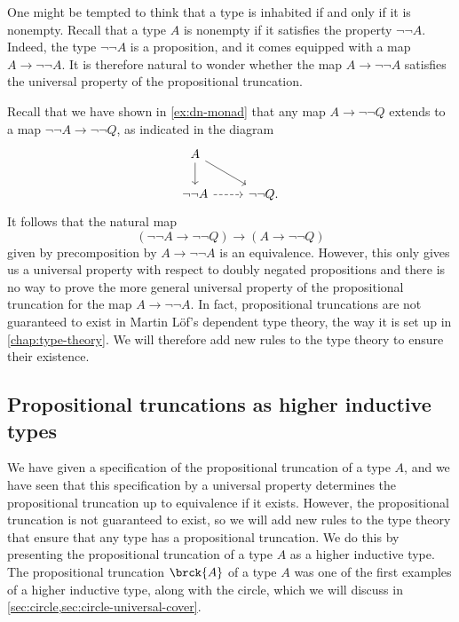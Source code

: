 \begin{rmk}
  One might be tempted to think that a type is inhabited if and only if it is nonempty. Recall that a type $A$ is nonempty if it satisfies the property $\neg\neg A$. Indeed, the type $\neg\neg A$ is a proposition, and it comes equipped with a map $A\to\neg\neg A$. It is therefore natural to wonder whether the map $A\to\neg\neg A$ satisfies the universal property of the propositional truncation.

  Recall that we have shown in \cref{ex:dn-monad} that any map $A\to\neg\neg Q$ extends to a map $\neg\neg A\to\neg\neg Q$, as indicated in the diagram
\begin{equation*}
  \begin{tikzcd}
    A \arrow[d] \arrow[dr] \\
    \neg\neg A \arrow[r,dashed] & \neg\neg Q.
  \end{tikzcd}
\end{equation*}
It follows that the natural map
\begin{equation*}
  (\neg\neg A\to\neg\neg Q)\to (A\to \neg\neg Q)
\end{equation*}
given by precomposition by $A\to\neg\neg A$ is an equivalence. However, this only gives us a universal property with respect to doubly negated propositions and there is no way to prove the more general universal property of the propositional truncation for the map $A\to\neg\neg A$. In fact, propositional truncations are not guaranteed to exist in Martin L\"of's dependent type theory, the way it is set up in \cref{chap:type-theory}. We will therefore add new rules to the type theory to ensure their existence.
\end{rmk}

\subsection{Propositional truncations as higher inductive types}\label{sec:propositional-truncation-hit}

We have given a specification of the propositional truncation of a type $A$, and we have seen that this specification by a universal property determines the propositional truncation up to equivalence if it exists. However, the propositional truncation is not guaranteed to exist, so we will add new rules to the type theory that ensure that any type has a propositional truncation. We do this by presenting the propositional truncation of a type $A$ as a higher inductive type. The propositional truncation $\brck{A}$ of a type $A$ was one of the first examples of a higher inductive type, along with the circle, which we will discuss in \cref{sec:circle,sec:circle-universal-cover}.

